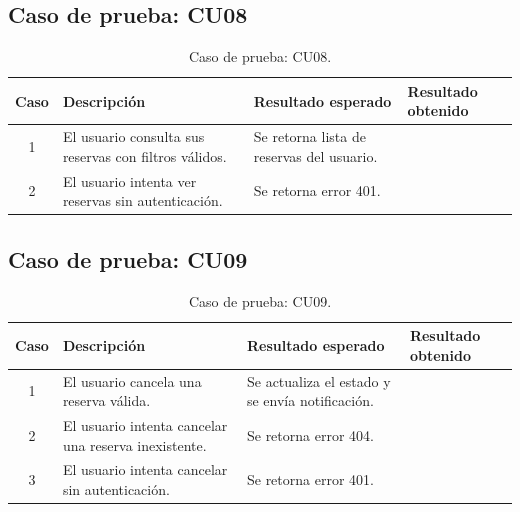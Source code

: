 
\subsection{Caso de prueba: CU08}

\begin{table}[H]
\centering
\label{tab:cu08_white_test}
\renewcommand{\arraystretch}{1.3}
\begin{tabular}{|c|p{5cm}|p{6cm}|p{2.5cm}|}
\hline
\rowcolor[RGB]{217,217,217}
\textbf{Caso} & \textbf{Descripción} & \textbf{Resultado esperado} & \textbf{Resultado obtenido} \\
\hline

1 &
El usuario consulta sus reservas con filtros válidos. &
Se retorna lista de reservas del usuario. &
 \\
\hline

2 &
El usuario intenta ver reservas sin autenticación. &
Se retorna error 401. &
 \\
\hline

\end{tabular}
\caption{Caso de prueba: CU08.}
\end{table}


\subsection{Caso de prueba: CU09}

\begin{table}[H]
\centering
\label{tab:cu09_white_test}
\renewcommand{\arraystretch}{1.3}
\begin{tabular}{|c|p{5cm}|p{6cm}|p{2.5cm}|}
\hline
\rowcolor[RGB]{217,217,217}
\textbf{Caso} & \textbf{Descripción} & \textbf{Resultado esperado} & \textbf{Resultado obtenido} \\
\hline

1 &
El usuario cancela una reserva válida. &
Se actualiza el estado y se envía notificación. &
 \\
\hline

2 &
El usuario intenta cancelar una reserva inexistente. &
Se retorna error 404. &
 \\
\hline

3 &
El usuario intenta cancelar sin autenticación. &
Se retorna error 401. &
 \\
\hline

\end{tabular}
\caption{Caso de prueba: CU09.}
\end{table}

